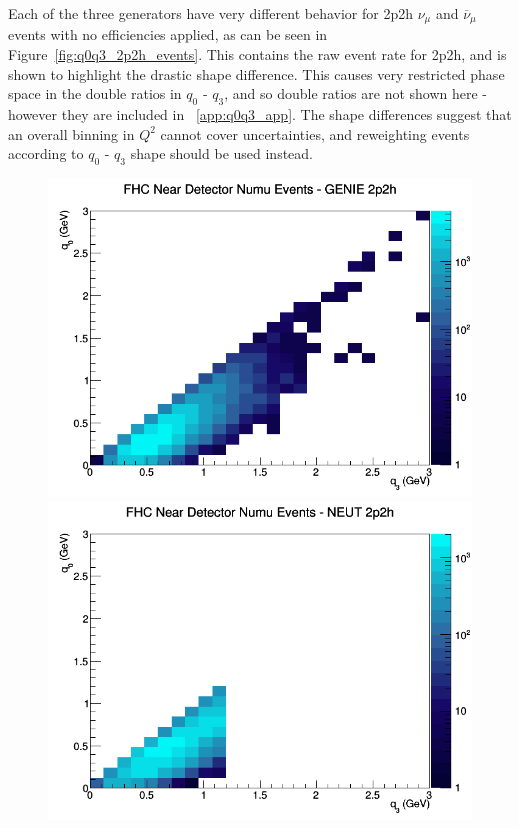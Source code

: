 \documentclass[12pt]{article}
\begin{document}
Each of the three generators have very different behavior for 2p2h $\nu_\mu$ and $\overline{\nu}_{\mu}$ events with no efficiencies applied, as can be seen in Figure~\ref{fig:q0q3_2p2h_events}. This contains the raw event rate for 2p2h, and is shown to highlight the drastic shape difference. This causes very restricted phase space in the double ratios in $q_0 \textrm{ - } q_3$, and so double ratios are not shown here - however they are included in ~\ref{app:q0q3_app}. The shape differences suggest that an overall binning in $Q^2$ cannot cover uncertainties, and reweighting events according to $q_0 \textrm{ - } q_3$ shape should be used instead.
\begin{figure}[h]
\centering
{}
\includegraphics[width=\linewidth]{q0_q3/nominal/2p2h_FHC_ND_numu_q3_q0_GENIE.png}
\endminipage
{}
\includegraphics[width=\linewidth]{q0_q3/nominal/2p2h_FHC_ND_numu_q3_q0_NEUT.png}

\end{figure}
\end{document}
